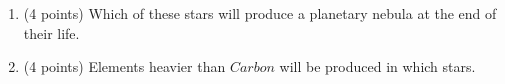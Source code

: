 \documentclass[12pt]{article}
\begin{document}
\begin{enumerate}
\begin{enumerate}

\item (4 points) Which of these stars will produce a planetary nebula at the end of their life.

\vskip0.3in

\item (4 points) Elements heavier than $Carbon$ will be produced in which stars.

\end{enumerate}
\end{enumerate}
\end{document}
